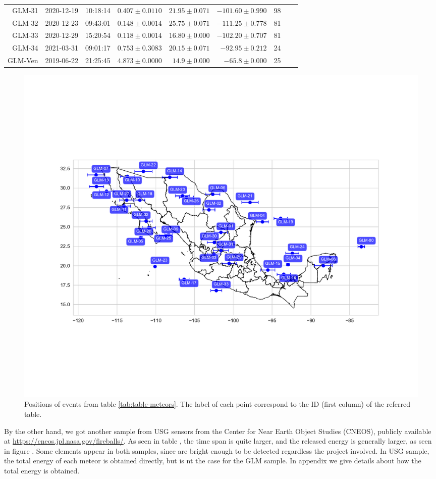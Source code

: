 \begin{table}
\begin{tabular}{rrrrrrrrr}
GLM-31 & 2020-12-19 & 10:18:14 & $0.407\pm 0.0110$ & $21.95 \pm 0.071$ & $-101.60 \pm  0.990$ & 98           \\
GLM-32 & 2020-12-23 & 09:43:01 & $0.148\pm 0.0014$ & $25.75 \pm 0.071$ & $-111.25 \pm  0.778$ & 81           \\
GLM-33 & 2020-12-29 & 15:20:54 & $0.118\pm 0.0014$ & $16.80 \pm 0.000$ & $-102.20 \pm  0.707$ & 81           \\
GLM-34 & 2021-03-31 & 09:01:17 & $0.753\pm 0.3083$ & $20.15 \pm 0.071$ & $-92.95 \pm  0.212$  & 24           \\
GLM-Ven& 2019-06-22 & 21:25:45 & $4.873\pm 0.0000$ & $14.9 \pm 0.000$  & $-65.8 \pm 0.000$    & 25           \\ \hline
\end{tabular}
\end{table}

\begin{figure}
  \centering
  \includegraphics[width=\linewidth]{../meteors_map}
  \caption{Positions of events from table \ref{tab:table-meteors}. The label of each point correspond to the ID (first column) of the referred table.}
  \label{fig:meteors-map}
\end{figure}

By the other hand, we got another sample from USG sensors from the Center for Near Earth Object Studies (CNEOS), publicly available at \url{https://cneos.jpl.nasa.gov/fireballs/}. As seen in table  , the time span is quite larger, and the released energy is generally larger, as seen in figure  . Some elements appear in both samples, since are bright enough to be detected regardless the project involved. In USG sample, the total energy of each meteor is obtained directly, but is nt the case for the GLM sample. In appendix  we give details about how the total energy is obtained.

